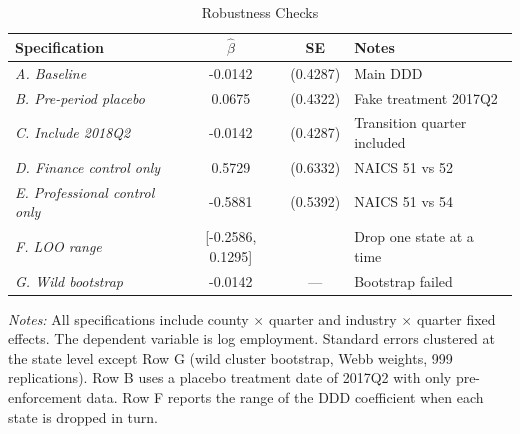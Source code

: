 \begin{table}[t]
\centering
\begin{threeparttable}
\caption{Robustness Checks}
\label{tab:robustness}
\small
\begin{tabular}{lccl}
\toprule
Specification & $\hat{\beta}$ & SE & Notes \\
\midrule
\textit{A. Baseline} & -0.0142 & (0.4287) & Main DDD \\
\textit{B. Pre-period placebo} & 0.0675 & (0.4322) & Fake treatment 2017Q2 \\
\textit{C. Include 2018Q2} & -0.0142 & (0.4287) & Transition quarter included \\
\textit{D. Finance control only} & 0.5729 & (0.6332) & NAICS 51 vs 52 \\
\textit{E. Professional control only} & -0.5881 & (0.5392) & NAICS 51 vs 54 \\
\textit{F. LOO range} & [-0.2586, 0.1295] & & Drop one state at a time \\
\textit{G. Wild bootstrap} & -0.0142 & --- & Bootstrap failed \\
\bottomrule
\end{tabular}
\begin{tablenotes}[flushleft]\small
\item \textit{Notes:} All specifications include county $\times$ quarter and industry $\times$ quarter fixed effects. The dependent variable is log employment. Standard errors clustered at the state level except Row G (wild cluster bootstrap, Webb weights, 999 replications). Row B uses a placebo treatment date of 2017Q2 with only pre-enforcement data. Row F reports the range of the DDD coefficient when each state is dropped in turn.
\end{tablenotes}
\end{threeparttable}
\end{table}
